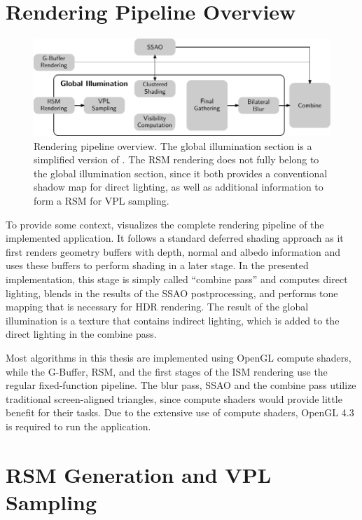 \section{Rendering Pipeline Overview}

\begin{figure}[h]
    \includegraphics[width=\textwidth]{graphics/rendering_pipeline_overview2}
    \caption{Rendering pipeline overview. The global illumination section is a simplified version of . The RSM rendering does not fully belong to the global illumination section, since it both provides a conventional shadow map for direct lighting, as well as additional information to form a RSM for VPL sampling.}
    \label{fig:RenderingPipelineOverview}
\end{figure}

To provide some context,  visualizes the complete rendering pipeline of the implemented application. It follows a standard deferred shading approach as it first renders geometry buffers with depth, normal and albedo information and uses these buffers to perform shading in a later stage. In the presented implementation, this stage is simply called ``combine pass'' and computes direct lighting, blends in the results of the SSAO postprocessing, and performs tone mapping that is necessary for HDR rendering. The result of the global illumination is a texture that contains indirect lighting, which is added to the direct lighting in the combine pass.

Most algorithms in this thesis are implemented using OpenGL compute shaders, while the G-Buffer, RSM, and the first stages of the ISM rendering use the regular fixed-function pipeline. The blur pass, SSAO and the combine pass utilize traditional screen-aligned triangles, since compute shaders would provide little benefit for their tasks. Due to the extensive use of compute shaders, OpenGL 4.3 is required to run the application.


\section{RSM Generation and VPL Sampling}
\label{sec:impl:rsmAndVplSampling}


